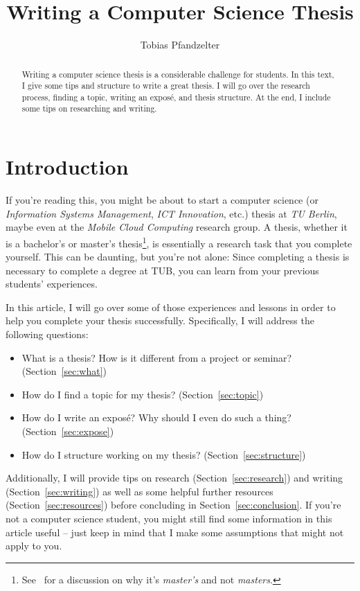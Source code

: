 \documentclass[a4]{article}
\title{Writing a Computer Science Thesis}
\author{Tobias Pfandzelter}
\affil{Mobile Cloud Computing Research Group\\TU Berlin \& Einstein Center Digital Future\\Berlin, Germany\\\texttt{tp@mcc.tu-berlin.de}}
\begin{document}
\maketitle
\begin{abstract}
    Writing a computer science thesis is a considerable challenge for students.
    In this text, I give some tips and structure to write a great thesis.
    I will go over the research process, finding a topic, writing an expos\'e, and thesis structure.
    At the end, I include some tips on researching and writing.
\end{abstract}

\section{Introduction}
\label{sec:introduction}

If you're reading this, you might be about to start a computer science (or \emph{Information Systems Management}, \emph{ICT Innovation}, etc.) thesis at \emph{TU Berlin}, maybe even at the \emph{Mobile Cloud Computing} research group.
A thesis, whether it is a bachelor's or master's thesis\footnote{See~\cite{masters-apostrophe-as} for a discussion on why it's \emph{master's} and not \emph{masters}.}, is essentially a research task that you complete yourself.
This can be daunting, but you're not alone: Since completing a thesis is necessary to complete a degree at TUB, you can learn from your previous students' experiences.

In this article, I will go over some of those experiences and lessons in order to help you complete your thesis successfully.
Specifically, I will address the following questions:

\begin{itemize}
    \item What is a thesis? How is it different from a project or seminar? (Section~\ref{sec:what})
    \item How do I find a topic for my thesis? (Section~\ref{sec:topic})
    \item How do I write an expos\'e? Why should I even do such a thing? (Section~\ref{sec:expose})
    \item How do I structure working on my thesis? (Section~\ref{sec:structure})
\end{itemize}

Additionally, I will provide tips on research (Section~\ref{sec:research}) and writing (Section~\ref{sec:writing}) as well as some helpful further resources (Section~\ref{sec:resources}) before concluding in Section~\ref{sec:conclusion}.
If you're not a computer science student, you might still find some information in this article useful -- just keep in mind that I make some assumptions that might not apply to you.
\end{document}
